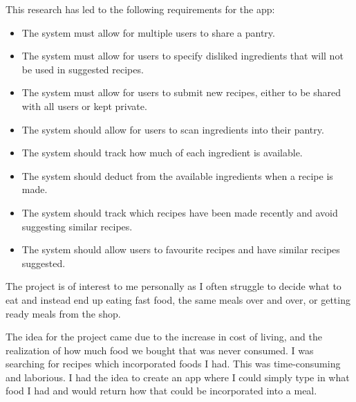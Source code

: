 \documentclass[../CHEFCookingHelperForEveryonesFridge.tex]{subfiles}
\begin{document}
This research has led to the following requirements for the \chef{} app:
\begin{itemize}
    \item The system must allow for multiple users to share a pantry.
    \item The system must allow for users to specify disliked ingredients that will not be used in suggested recipes.
    \item The system must allow for users to submit new recipes, either to be shared with all users or kept private.
    \item The system should allow for users to scan ingredients into their pantry.
    \item The system should track how much of each ingredient is available.
    \item The system should deduct from the available ingredients when a recipe is made.
    \item The system should track which recipes have been made recently and avoid suggesting similar recipes.
    \item The system should allow users to favourite recipes and have similar recipes suggested.
\end{itemize}
The project is of interest to me personally as I often struggle to decide what to eat and instead end up eating fast food,
the same meals over and over, or getting ready meals from the shop.

The idea for the project came due to the increase in cost of living, and the realization of how much food we bought that was
never consumed. I was searching for recipes which incorporated foods I had. This was time-consuming and laborious.
I had the idea to create an app where I could simply type in what food I had and would return how that could be incorporated
into a meal.
\end{document}
